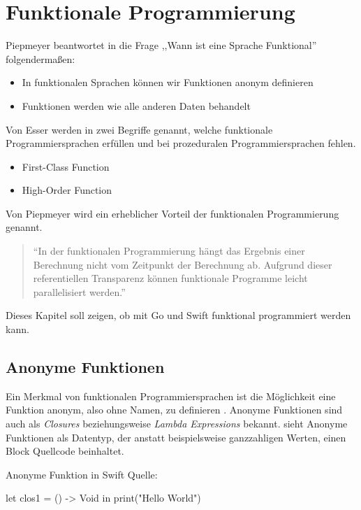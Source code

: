 \chapter{Funktionale Programmierung}
Piepmeyer beantwortet in \cite[S.6]{Piepmeyer.2010} die Frage ,,Wann ist eine Sprache Funktional'' folgendermaßen:

\begin{itemize}
    \item In funktionalen Sprachen können wir Funktionen anonym definieren
    \item Funktionen werden wie alle anderen Daten behandelt
\end{itemize}

Von Esser werden in \cite[S.243]{Esser.2011} zwei Begriffe genannt, welche funktionale Programmiersprachen erfüllen und bei prozeduralen Programmiersprachen fehlen.

\begin{itemize}
    \item First-Class Function
    \item High-Order Function
\end{itemize}

Von Piepmeyer wird ein erheblicher Vorteil der funktionalen Programmierung genannt.

\begin{quote}
\enquote{In der funktionalen Programmierung hängt das Ergebnis einer Berechnung nicht vom Zeitpunkt der Berechnung ab. Aufgrund dieser referentiellen Transparenz können funktionale Programme leicht parallelisiert werden.} \cite[S.13]{Piepmeyer.2010}
\end{quote}

Dieses Kapitel soll zeigen, ob mit Go und Swift funktional programmiert werden kann. 

\section{Anonyme Funktionen}
Ein Merkmal von funktionalen Programmiersprachen ist die Möglichkeit eine Funktion anonym, also ohne Namen, zu definieren \cite[S.28]{Piepmeyer.2010}.
Anonyme Funktionen sind auch als \textit{Closures} beziehungsweise \textit{Lambda Expressions} bekannt.
\cite[S.219]{Hoffman.2017} sieht Anonyme Funktionen als Datentyp, der anstatt beispielsweise ganzzahligen Werten, einen Block Quellcode beinhaltet.

\begin{listing}[H]
\caption{Anonyme Funktion in Swift Quelle: \cite[S.220]{Hoffman.2017}}
\label{lst:SwiftClosure}
\begin{SwiftCode}
let clos1 = {
    () -> Void in
    print("Hello World")
}
\end{SwiftCode}
\end{listing}

